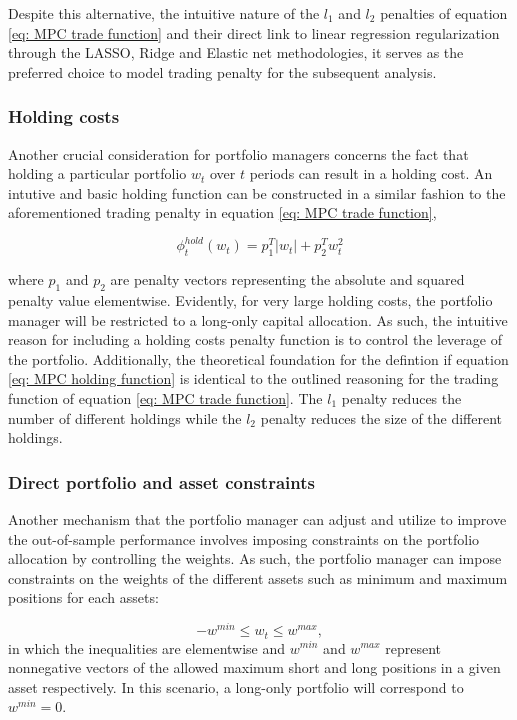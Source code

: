 Despite this alternative, the intuitive nature of the $l_1$ and $l_2$ penalties of equation \ref{eq: MPC trade function} and their direct link to linear regression regularization through the LASSO, Ridge and Elastic net methodologies, it serves as the preferred choice to model trading penalty for the subsequent analysis.

\subsubsection{Holding costs}
Another crucial consideration for portfolio managers concerns the fact that holding a particular portfolio $w_t$ over $t$ periods can result in a holding cost. An intutive and basic holding function can be constructed in a similar fashion to the aforementioned trading penalty in equation \ref{eq: MPC trade function},

\begin{equation}
    \phi_t^{hold}(w_t) = p_1^T|w_t| + p_2^Tw_t^2
    \label{eq: MPC holding function}
\end{equation}

where $p_1$ and $p_2$ are penalty vectors representing the absolute and squared penalty value elementwise. Evidently, for very large holding costs, the portfolio manager will be restricted to a long-only capital allocation. As such, the intuitive reason for including a holding costs penalty function is to control the leverage of the portfolio. Additionally, the theoretical foundation for the defintion if equation \ref{eq: MPC holding function} is identical to the outlined reasoning for the trading function of equation \ref{eq: MPC trade function}. The $l_1$ penalty reduces the number of different holdings while the $l_2$ penalty reduces the size of the different holdings.

\subsubsection{ Direct portfolio and asset constraints}
Another mechanism that the portfolio manager can adjust and utilize to improve the out-of-sample performance involves imposing constraints on the portfolio allocation by controlling the weights. As such, the portfolio manager can impose constraints on the weights of the different assets such as minimum and maximum positions for each assets:

\begin{equation}
    -w^{min}\leq w_t\leq w^{max},
\end{equation}
in which the inequalities are elementwise and $w^{min}$ and $w^{max}$ represent nonnegative vectors of the allowed maximum short and long positions in a given asset respectively. In this scenario, a long-only portfolio will correspond to $w^{min}=0$.


